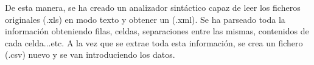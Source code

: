 De esta manera, se ha creado un analizador sintáctico capaz de leer los ficheros originales (.xls) en modo texto y obtener un (.xml). Se ha parseado toda la información obteniendo filas, celdas, separaciones entre las mismas, contenidos de cada celda...etc. A la vez que se extrae toda esta información, se crea un fichero (.csv) nuevo y se van introduciendo los datos.

